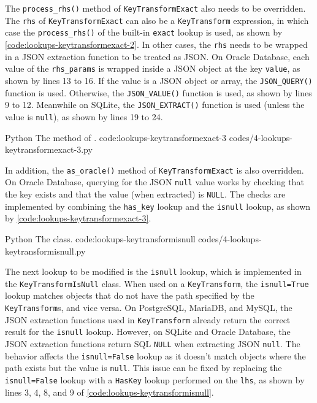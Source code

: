The \verb|process_rhs()| method of \verb|KeyTransformExact| also needs to be
overridden. The \verb|rhs| of \verb|KeyTransformExact| can also be a
\verb|KeyTransform| expression, in which case the \verb|process_rhs()| of the
built-in \verb|exact| lookup is used, as shown by
\autoref{code:lookups-keytransformexact-2}. In other cases, the \verb|rhs|
needs to be wrapped in a JSON extraction function to be treated as JSON. On
Oracle Database, each value of the \verb|rhs_params| is wrapped inside a JSON
object at the key \verb|value|, as shown by lines 13 to 16. If the value is a
JSON object or array, the \verb|JSON_QUERY()| function is used. Otherwise, the
\verb|JSON_VALUE()| function is used, as shown by lines 9 to 12. Meanwhile on
SQLite, the \verb|JSON_EXTRACT()| function is used (unless the value is
\verb|null|), as shown by lines 19 to 24.

\listing
{Python}
{The  method of .}
{code:lookups-keytransformexact-3}
{codes/4-lookups-keytransformexact-3.py}

In addition, the \verb|as_oracle()| method of \verb|KeyTransformExact| is also
overridden. On Oracle Database, querying for the JSON \verb|null| value works
by checking that the key exists and that the value (when extracted) is
\verb|NULL|. The checks are implemented by combining the \verb|has_key| lookup
and the \verb|isnull| lookup, as shown by
\autoref{code:lookups-keytransformexact-3}.

\listing
{Python}
{The  class.}
{code:lookups-keytransformisnull}
{codes/4-lookups-keytransformisnull.py}

The next lookup to be modified is the \verb|isnull| lookup, which is
implemented in the \verb|KeyTransformIsNull| class. When used on a
\verb|KeyTransform|, the \verb|isnull=True| lookup matches objects that do not
have the path specified by the \verb|KeyTransform|s, and vice versa. On
PostgreSQL, MariaDB, and MySQL, the JSON extraction functions used in
\verb|KeyTransform| already return the correct result for the \verb|isnull|
lookup. However, on SQLite and Oracle Database, the JSON extraction functions
return SQL \verb|NULL| when extracting JSON \verb|null|. The behavior affects
the \verb|isnull=False| lookup as it doesn't match objects where the path
exists but the value is \verb|null|. This issue can be fixed by replacing the
\verb|isnull=False| lookup with a \verb|HasKey| lookup performed on the
\verb|lhs|, as shown by lines 3, 4, 8, and 9 of
\autoref{code:lookups-keytransformisnull}.
